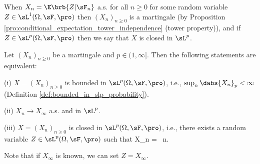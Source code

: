 \begin{definition}\label{def:closed_in_lp_discrete}
When $X_n = \E\brb{Z | \sF_n}$ a.s. for all $n \geq 0$ for some random variable $Z\in \sL^1(\Omega,\sF,\pro)$ then $(X_n)_{n \geq 0}$ is a martingale (by Proposition \ref{pro:conditional_expectation_tower_independence} (tower property)), and if $Z \in \sL^p(\Omega ,\sF,\pro)$ then we say that $X$ is closed in $\sL^p$.
\end{definition}


\begin{theorem}[[$\sL^p$ martingale convergence theorem\index{lp-martingale-convergence@$\sL^p$ martingale convergence theorem!discrete}]\label{thm:martingale_bounded_lp_as_lp_closed_discrete}
Let $(X_n)_{n \geq 0}$ be a martingale and $p \in (1,\infty]$. Then the following statements are equivalent:
\ben
\item [(i)] $X = (X_n)_{n\geq 0}$ is bounded in $\sL^p(\Omega,\sF,\pro)$, i.e., $\sup_n \dabs{X_n}_p <\infty$ (Definition \ref{def:bounded_in_slp_probability}).
\item [(ii)] $X_n \to  X_\infty$ a.s. and in $\sL^p$.
\item [(iii)] $X = (X_n)_{n\geq 0}$ is closed in $\sL^p(\Omega,\sF,\pro)$, i.e., there exists a random variable $Z\in \sL^p(\Omega ,\sF,\pro)$ such that
\be
X_n = \E{}\ n.
\ee

Note that if $X_\infty$ is known, we can set $Z = X_\infty$.
\een
\end{theorem}


